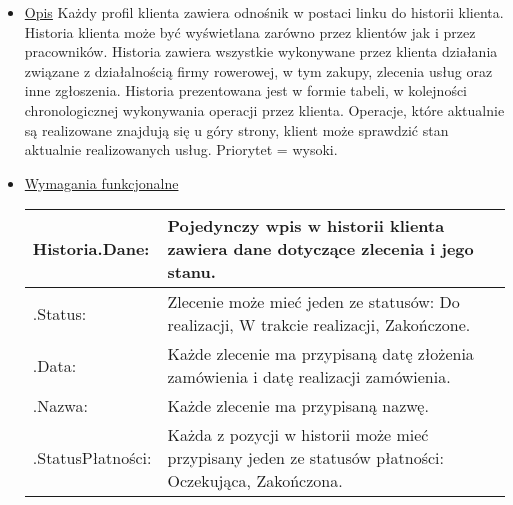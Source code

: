 \documentclass[a4paper,20pt]{article}
\begin{document}
\begin{itemize}
\item \underline{Opis} 
\newline
\newline
Każdy profil klienta zawiera odnośnik w postaci linku do historii klienta. Historia klienta może być wyświetlana zarówno przez klientów jak i przez pracowników. Historia zawiera wszystkie wykonywane przez klienta działania związane z działalnością firmy rowerowej, w tym zakupy, zlecenia usług oraz inne zgłoszenia. Historia prezentowana jest w formie tabeli, w kolejności chronologicznej wykonywania operacji przez klienta. Operacje, które aktualnie są realizowane znajdują się u góry strony, klient może sprawdzić stan aktualnie realizowanych usług. Priorytet = wysoki.
\newline

\item \underline{Wymagania funkcjonalne}

\begin{center}
\begin{tabularx}{\textwidth}[t]{XX}


\arrayrulecolor{black}\hline
\textbf{Historia.Dane:} & \textbf{Pojedynczy wpis w historii klienta zawiera dane dotyczące zlecenia i jego stanu.} \\

\hline

\quad .Status: & 
\begin{minipage}[t]{\linewidth}%
Zlecenie może mieć jeden ze statusów: Do realizacji, W trakcie realizacji, Zakończone.    
\end{minipage}\\

\quad .Data: & 
\begin{minipage}[t]{\linewidth}%
Każde zlecenie ma przypisaną datę złożenia zamówienia i datę realizacji zamówienia. 
\end{minipage}\\

\quad .Nazwa: & 
\begin{minipage}[t]{\linewidth}%
Każde zlecenie ma przypisaną nazwę.  
\end{minipage}\\

\quad .StatusPłatności: & 
\begin{minipage}[t]{\linewidth}%
Każda z pozycji w historii może mieć przypisany jeden ze statusów płatności: Oczekująca, Zakończona.  
\end{minipage}\\



\end{tabularx}
\end{center}
\end{itemize}
\end{document}
